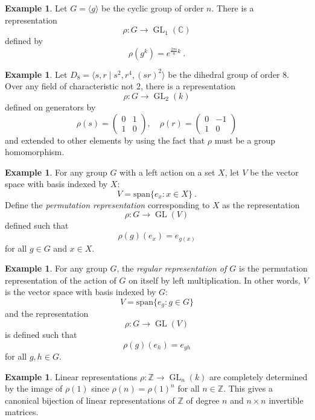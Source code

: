 \documentclass[12pt]{article}
\theoremstyle{plain}
\theoremstyle{definition}
\newtheorem{example}[theorem]{Example}
\theoremstyle{remark}
\numberwithin{equation}{section}
\begin{document}
\begin{example}
Let $G = \langle g \rangle$ be the cyclic group of order $n$.
There is a representation
\[ \rho : G \to \operatorname{GL}_1(\mathbb{C}) \]
defined by
\[
\rho(g^k)=e^{\frac{2\pi i}{n}k} \ .
\]
\end{example}

\begin{example}
Let $D_8 = \langle s,r \mid s^2, r^4, (sr)^2 \rangle$
be the dihedral group of order $8$.
Over any field of characteristic not $2$, there is a representation
\[ \rho : G \to \operatorname{GL}_2(k) \]
defined on generators by
\[
\rho(s)=\begin{pmatrix} 0&1\\1&0 \end{pmatrix} ,\quad
\rho(r)=\begin{pmatrix} 0&-1\\1&0 \end{pmatrix}
\]
and extended to other elements by using the fact that $\rho$
must be a group homomorphism.
\end{example}


\begin{example}
For any group $G$ with a left action on a set $X$,
let $V$ be the vector space with basis indexed by $X$:
\[
V = \mathrm{span} \{ e_x : x \in X \} \ .
\]
Define the \emph{permutation representation} corresponding to $X$
as the representation
\[
\rho : G \to \operatorname{GL}(V)
\]
defined such that
\[
\rho(g)(e_x) = e_{g(x)}
\]
for all $g \in G$ and $x \in X$.
\end{example}

\begin{example}
For any group $G$, the \emph{regular representation of $G$}
is the permutation representation of the action of $G$ on itself by left
multiplication.
In other words, 
$V$ is the vector space with basis indexed by $G$:
\[
V = \mathrm{span} \{ e_g : g \in G \}
\]
and the representation
\[
\rho : G \to \operatorname{GL}(V)
\]
is defined such that
\[
\rho(g)(e_h) = e_{gh}
\]
for all $g,h \in G$.
\end{example}

\begin{example} \label{ex:lin_alg_is_Z_rep_theory}
Linear representations $\rho : \mathbb{Z} \to \operatorname{GL}_n(k)$
are completely determined by the image of $\rho(1)$
since $\rho(n)=\rho(1)^n$ for all $n \in \mathbb{Z}$.
This gives a canonical bijection of linear representations of
$\mathbb{Z}$ of degree $n$ and
$n \times n$ invertible matrices.
\end{example}
\end{document}
